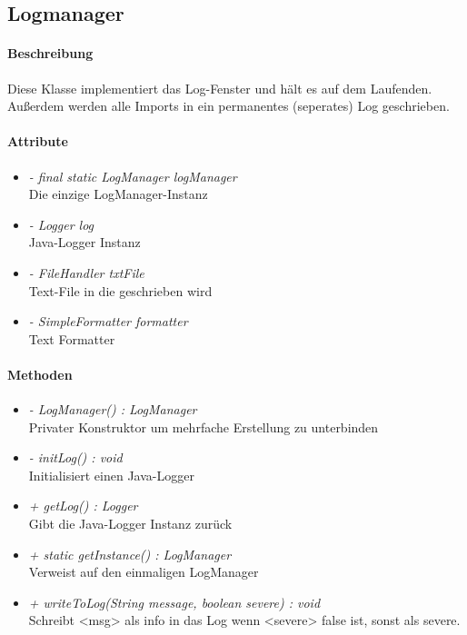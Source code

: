 \subsection{Logmanager}

\paragraph{Beschreibung}
Diese Klasse implementiert das Log-Fenster und hält es auf dem Laufenden.
Außerdem werden alle Imports in ein permanentes (seperates) Log geschrieben.


\paragraph{Attribute}

\begin{itemize}
	
\item \textit{- final static LogManager logManager}  
\\ Die einzige LogManager-Instanz 
\item \textit{- Logger log}
\\ Java-Logger Instanz
\item \textit{- FileHandler txtFile}
\\ Text-File in die geschrieben wird
\item \textit{-  SimpleFormatter formatter}
\\ Text Formatter

\end{itemize}

\paragraph{Methoden}

\begin{itemize}
	
\item \textit{ - LogManager() : LogManager}  \\ Privater Konstruktor um mehrfache Erstellung zu unterbinden
\item \textit{ - initLog() : void} \\ Initialisiert einen Java-Logger
\item \textit{ + getLog() : Logger} \\ Gibt die Java-Logger Instanz zurück
\item \textit{ + static getInstance() : LogManager}  \\ Verweist auf den einmaligen LogManager
\item \textit{ + writeToLog(String message, boolean severe) : void} \\ Schreibt <msg> als info in das Log wenn <severe> false ist,
sonst als severe.
	
\end{itemize}